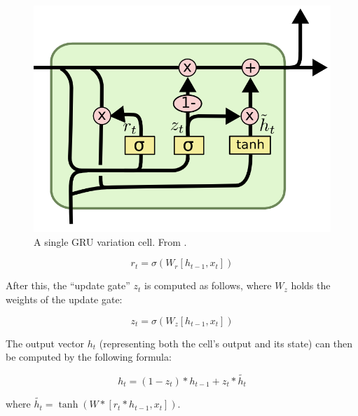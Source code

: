         \begin{figure}[h!]
            \begin{center}
                \includegraphics[scale=0.5]{figs/gru_cell.png}
            \end{center}
            \caption{A single GRU variation cell. From \cite{olah2015understanding}.}
            \label{fig:gru_cell}
        \end{figure}

        \begin{equation}
            r_t = \sigma\left(W_r [h_{t-1}, x_t]\right)
            \label{eq:gru_reset_gate}
        \end{equation}

        After this, the ``update gate'' $z_t$ is computed as follows, where $W_z$ holds the weights of the update gate:

        \begin{equation}
            z_t = \sigma\left(W_z [h_{t-1}, x_t]\right)
            \label{eq:gru_update_gate}
        \end{equation}

        The output vector $h_t$ (representing both the cell's output and its state) can then be computed by the following formula:

        \begin{equation}
            h_t = (1 - z_t) * h_{t-1} + z_t * \tilde{h_t}
            \label{eq:gru_output}
        \end{equation}

        where $\tilde{h_t} = \tanh(W * [r_t * h_{t-1}, x_t])$.

